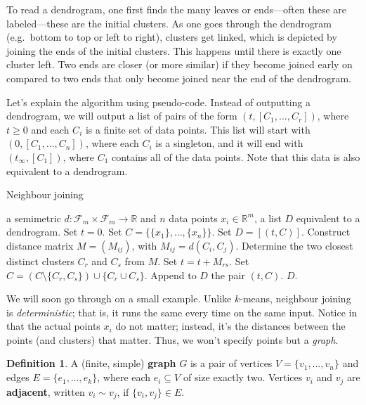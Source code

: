 \documentclass[a4paper, 12pt]{article}
\numberwithin{equation}{section}
\numberwithin{figure}{section}
\theoremstyle{definition}
\newtheorem{defn}[thm]{Definition}
\renewcommand{\geq}{\geqslant}
\newcommand{\R}{\mathbb{R}}
\begin{document}
To read a dendrogram, one first finds the many leaves or ends---often these are
labeled---these are the initial clusters. As one goes through the dendrogram
(e.g.\ bottom to top or left to right), clusters get linked, which is depicted
by joining the ends of the initial clusters. This happens until there is exactly
one cluster left. Two ends are closer (or more similar) if they become joined
early on compared to two ends that only become joined near the end of the
dendrogram. 

Let's explain the algorithm using pseudo-code. Instead of outputting a
dendrogram, we will output a list of pairs of the form $(t, [C_1,\dots, C_r])$,
where $t\geq 0$ and each $C_i$ is a finite set of data points. This list will
start with $(0, [C_1,\dots, C_n])$, where each $C_i$ is a singleton, and it will
end with $(t_\infty, [C_1])$, where $C_1$ contains all of the data points. Note
that this data is also equivalent to a dendrogram.

\begin{algorithm}
	\caption{Neighbour joining}\label{alg:neighbour}
	\begin{algorithmic}[1]
		\Require a semimetric $d : \mathscr{F}_m\times \mathscr{F}_m\to \R$ and $n$ data points $x_i\in\R^m$,
		\Ensure a list $D$ equivalent to a dendrogram.
		\State Set $t=0$.
		\State Set $C = \{\{x_1\}, \dots, \{x_n\}\}$.
		\State Set $D = [(t, C)]$.
			\State Construct distance matrix $M = (M_{ij})$, with $M_{ij} = d(C_i, C_j)$.
			\State Determine the two closest distinct clusters $C_r$ and $C_s$ from $M$.
			\State Set $t = t + M_{rs}$.
			\State Set $C = (C \setminus \{C_r, C_s\}) \cup \{C_r \cup C_s\}$.
			\State Append to $D$ the pair $(t, C)$.
		\EndWhile
		\State \Return $D$.
	\end{algorithmic}
\end{algorithm}

We will soon go through  on a small example. Unlike
$k$-means, neighbour joining is \emph{deterministic}; that is, it runs the same
every time on the same input. Notice in  that the actual
points $x_i$ do not matter; instead, it's the distances between the points (and
clusters) that matter. Thus, we won't specify points but a \emph{graph}.

\begin{defn}
	A (finite, simple) \textbf{graph} $G$ is a pair of vertices $V = \{v_1,
	\dots, v_n\}$ and edges $E = \{e_1, \dots, e_k\}$, where each $e_i\subseteq
	V$ of size exactly two. Vertices $v_i$ and $v_j$ are \textbf{adjacent},
	written $v_i \sim v_j$, if $\{v_i, v_j\} \in E$.
\end{defn}
\end{document}
